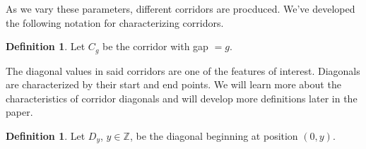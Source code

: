 \documentclass{article}
\newcommand*{\set}[1]{\mathbb{#1}}
\theoremstyle{definition}
\newtheorem{defn}[thm]{Definition}
\begin{document}
  \noindent As we vary these parameters, different corridors are procduced. We've developed the following notation for characterizing 
  corridors.
  \begin{defn} Let $C_g$ be the corridor with gap $=g$. \\ \end{defn}
  
  \noindent The diagonal values in said corridors are one of the features of interest. Diagonals are characterized by their start and end points.
  We will learn more about the characteristics of corridor diagonals and will develop more definitions later in the paper. 
  \begin{defn} Let $D_y$, $y \in \set{Z}$, be the diagonal beginning at position $(0, y)$. \\ \end{defn}

  
  
\end{document}

